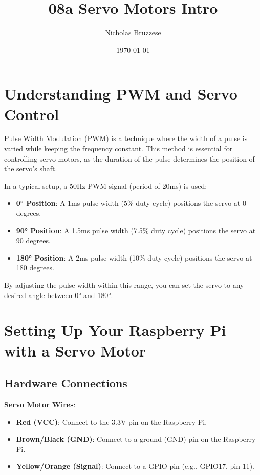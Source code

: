 \documentclass{article}
\title{08a Servo Motors Intro}
\author{Nicholas Bruzzese}
\date{\today}
\begin{document}
	
	\maketitle
	
	\section*{Understanding PWM and Servo Control}
	
	Pulse Width Modulation (PWM) is a technique where the width of a pulse is varied while keeping the frequency constant. This method is essential for controlling servo motors, as the duration of the pulse determines the position of the servo's shaft.
	
	In a typical setup, a 50Hz PWM signal (period of 20ms) is used:
	\begin{itemize}
		\item \textbf{0° Position}: A 1ms pulse width (5\% duty cycle) positions the servo at 0 degrees.
		\item \textbf{90° Position}: A 1.5ms pulse width (7.5\% duty cycle) positions the servo at 90 degrees.
		\item \textbf{180° Position}: A 2ms pulse width (10\% duty cycle) positions the servo at 180 degrees.
	\end{itemize}
	
	By adjusting the pulse width within this range, you can set the servo to any desired angle between 0° and 180°.
	
	\section*{Setting Up Your Raspberry Pi with a Servo Motor}
	
	\subsection*{Hardware Connections}
	
	\textbf{Servo Motor Wires}:
	\begin{itemize}
		\item \textbf{Red (VCC)}: Connect to the 3.3V pin on the Raspberry Pi.
		\item \textbf{Brown/Black (GND)}: Connect to a ground (GND) pin on the Raspberry Pi.
		\item \textbf{Yellow/Orange (Signal)}: Connect to a GPIO pin (e.g., GPIO17, pin 11).
	\end{itemize}
	
\end{document}
